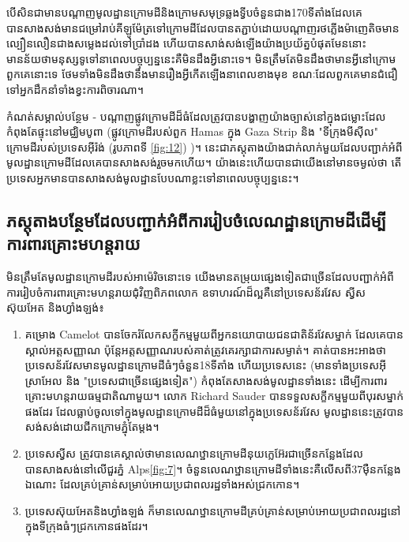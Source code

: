 \documentclass[10pt,twocolumn,letterpaper]{article}
\begin{document}
	បើសិនជាមានបណ្តាញមូលដ្ឋានក្រោមដីនិងក្រោមសមុទ្រឆ្លងទ្វីបចំនួនជាង170ទីតាំងដែលគេបានសាងសង់មានជម្រៅរាប់គីឡូម៉ែត្រទៅក្រោមដី​ ដែលបានតភ្ជាប់ដោយបណ្តាញរថភ្លើងម៉ាញេតិចមានល្បឿនលឿនជាងសម្លេងដល់ទៅប្រាំដង ហើយបានសាង់សង់ឡើងយ៉ាងប្រយ័ត្នបំផុតមែននោះ មានន័យថាមនុស្សទូទៅនាពេលបច្ចុប្បន្ននេះគឺមិនដឹងអ្វីនោះទេ។ មិនត្រឹមតែមិនដឹងថាមានអ្វីនៅក្រោមពួកគេនោះទេ ថែមទាំងមិនដឹងថានឹងមានរឿងអ្វីកើតឡើងនាពេលខាងមុខ ខណៈដែលពួកគេមានជំជឿទៅអ្នកដឹកនាំទាំងខ្វះការពិចារណា។

	កំណត់សម្គាល់បន្ថែម - បណ្តាញផ្លូវក្រោមដីដ៏ធំដែលត្រូវបានបង្ហាញយ៉ាងច្បាស់នៅក្នុងជម្លោះដែលកំពុងតែផ្ទុះនៅមជ្ឈិមបូពា (ផ្លូវក្រោមដីរបស់ពួក Hamas ក្នុង Gaza Strip\cite{38} និង "ទីក្រុងមីស៊ីល" ក្រោមដីរបស់ប្រទេសអុីរ៉ង់ (រូបភាពទី \ref{fig:12}) \cite{39,40})។ នេះជាភស្តុតាងយ៉ាងជាក់លាក់មួយដែលបញ្ជាក់អំពីមូលដ្ឋានក្រោមដីដែលគេបានសាងសង់រួចមកហើយ។ យ៉ាងនេះហើយបានជាយើងនៅមានចម្ងល់ថា តើប្រទេសអ្នកមានបានសាងសង់មូលដ្ឋានបែបណាខ្លះទៅនាពេលបច្ចុប្បន្ននេះ។ 
\subsection{ភស្តុតាងបន្ថែមដែលបញ្ជាក់អំពីការរៀបចំលេណដ្ឋានក្រោមដីដើម្បីការពារគ្រោះមហន្តរាយ}


	មិនត្រឹមតែមូលដ្ឋានក្រោមដីរបស់អាម៉េរិចនោះទេ យើងមានតម្រុយផ្សេងទៀតជាច្រើនដែលបញ្ជាក់អំពីការរៀបចំការពារគ្រោះមហន្តរាយជុំវិញពិភពលោក ឧទាហរណ៍​ដ៏ល្អគឺនៅប្រទេសន័រវែស ស្វីស ស៊ុយអែត និងហ្វាំងឡង់៖

\begin{flushleft}
\begin{enumerate}
    \item គម្រោង Camelot បានចែករំលែកសក្ខីកម្មមួយពីអ្នកនយោបាយជនជាតិន័រវែសម្នាក់\cite{25,26} ដែលគេបានស្គាល់អត្តសញ្ញាណ ប៉ុន្តែអត្តសញ្ញាណរបស់គាត់ត្រូវគេរក្សាជាការសម្ងាត់។ គាត់បានអះអាងថាប្រទេសន័រវែសមានមូលដ្ឋានក្រោមដីធំៗចំនួន18ទីតាំង ហើយប្រទេសនេះ (មានទាំងប្រទេសអុីស្រាអែល និង "ប្រទេសជាច្រើនផ្សេងទៀត") កំពុងតែសាងសង់មូលដ្ឋានទាំងនេះ ដើម្បីការពារគ្រោះមហន្តរាយធម្មជាតិណាមួយ។ លោក Richard Sauder បានទទួលសក្ខីកម្មមួយពីបុរសម្នាក់ផងដែរ ដែលធ្លាប់ចូលទៅក្នុងមូលដ្ឋានក្រោមដីដ៏ធំមួយនៅក្នុងប្រទេសន័រវែស មូលដ្ឋាននេះត្រូវបានសង់សង់ដោយជីកក្រោមភ្នុំតែម្តង\cite{22}។ 
    \item ប្រទេសស្វីស ត្រូវបានគេស្គាល់ថាមានលេណឋ្ឋានក្រោមដីនុយក្លេអ៊ែរជាច្រើនកន្លែងដែលបានសាងសង់នៅលើជួរភ្នំ Alps\ref{fig:7}។ ចំនួនលេណឋ្ឋានក្រោមដីទាំងនេះគឺលើសពី37មុឺនកន្លែងឯណោះ ដែលគ្រប់គ្រាន់សម្រាប់អោយប្រជាពលរដ្ឋទាំងអស់ជ្រកកោន\cite{27}។
    \item ប្រទេសស៊ុយអែតនិងហ្វាំងឡង់ ក៏មានលេណឋ្ឋានក្រោមដីគ្រប់គ្រាន់សម្រាប់អោយប្រជាពលរដ្ឋនៅក្នុងទីក្រុងធំៗជ្រកកោនផងដែរ\cite{27}។
\end{enumerate}
\end{flushleft}
\end{document}
